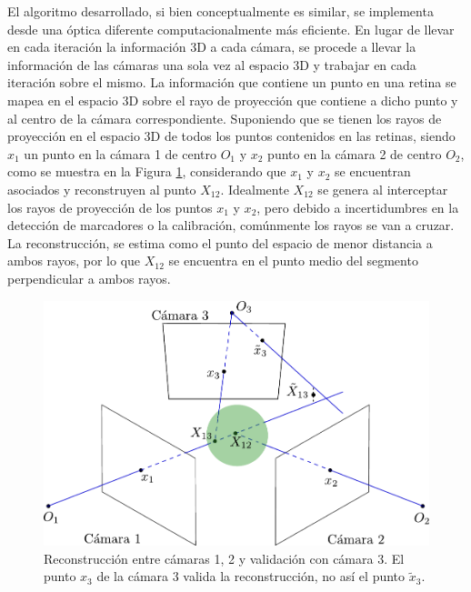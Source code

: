 El algoritmo desarrollado, si bien conceptualmente es similar, se implementa desde una óptica diferente computacionalmente más eficiente.
En lugar de llevar en cada iteración la información 3D a cada cámara, se procede a llevar la información de las cámaras una sola vez al espacio 3D y trabajar en cada iteración sobre el mismo. La información que contiene un punto en una retina se mapea en el espacio 3D sobre el rayo de proyección que contiene a dicho punto y al centro de la cámara correspondiente. Suponiendo que se tienen los rayos de proyección en el espacio 3D de todos los puntos contenidos en las retinas, siendo $x_1$ un punto en la cámara 1 de centro $O_1$ y $x_2$ punto en la cámara 2 de centro $O_2$, como se muestra en la Figura \ref{img_reconstruccion_validacion}, considerando que $x_1$ y $x_2$ se encuentran asociados y reconstruyen al punto $X_{12}$. Idealmente $X_{12}$ se genera al interceptar los rayos de proyección de los puntos $x_1$ y $x_2$, pero debido a incertidumbres en la detección de marcadores o la calibración, comúnmente los rayos se van a cruzar. La reconstrucción, se estima como el punto del espacio de menor distancia a ambos rayos, por lo que
$X_{12}$ se encuentra en el punto medio del segmento perpendicular a ambos rayos.


\begin{figure}[H]
\centering
\hspace{-1cm}
\captionsetup{justification=centering,margin=1.0cm}
\includegraphics[scale=0.65]{img/Reconstruccion/validacion.pdf}
\caption{Reconstrucción entre cámaras 1, 2 y validación con cámara 3. El punto $x_3$ de la cámara 3 valida la reconstrucción, no así el punto $\tilde{x}_3$.}
\label{img_reconstruccion_validacion}
\end{figure}

